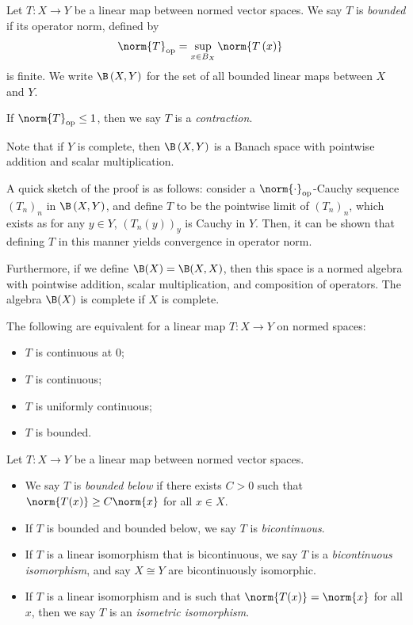 \begin{definition}
  Let $T\colon X\rightarrow Y$ be a linear map between normed vector spaces. We say $T$ is \textit{bounded} if its operator norm, defined by
  \begin{align*}
    \norm{T}_{\op} &= \sup_{x\in B_X}\norm{T\left(x\right)}
  \end{align*}
  is finite. We write $\B\left(X,Y\right)$ for the set of all bounded linear maps between $X$ and $Y$.\newline

  If $\norm{T}_{\op} \leq 1$, then we say $T$ is a \textit{contraction}.
\end{definition}
\begin{remark}
  Note that if $Y$ is complete, then $\B\left(X,Y\right)$ is a Banach space with pointwise addition and scalar multiplication.\newline

  A quick sketch of the proof is as follows: consider a $\norm{\cdot}_{\op}$-Cauchy sequence $\left(T_n\right)_n$ in $\B\left(X,Y\right)$, and define $T$ to be the pointwise limit of $\left(T_n\right)_n$, which exists as for any $y\in Y$, $\left(T_n\left(y\right)\right)_{y}$ is Cauchy in $Y$. Then, it can be shown that defining $T$ in this manner yields convergence in operator norm.\newline

  Furthermore, if we define $\B(X) = \B(X,X)$, then this space is a normed algebra with pointwise addition, scalar multiplication, and composition of operators. The algebra $\B(X)$ is complete if $X$ is complete.
\end{remark}
\begin{fact}\label{fact:continuity_of_linear_maps}
  The following are equivalent for a linear map $T\colon X\rightarrow Y$ on normed spaces:
  \begin{itemize}
    \item $T$ is continuous at $0$;
    \item $T$ is continuous;
    \item $T$ is uniformly continuous;
    \item $T$ is bounded.
  \end{itemize}
\end{fact}
\begin{definition}
  Let $T\colon X\rightarrow Y$ be a linear map between normed vector spaces.
  \begin{itemize}
    \item We say $T$ is \textit{bounded below} if there exists $C > 0$ such that $\norm{T(x)}\geq C\norm{x}$ for all $x\in X$.
    \item If $T$ is bounded and bounded below, we say $T$ is \textit{bicontinuous}.
    \item If $T$ is a linear isomorphism that is bicontinuous, we say $T$ is a \textit{bicontinuous isomorphism}, and say $X\cong Y$ are bicontinuously isomorphic.
    \item If $T$ is a linear isomorphism and is such that $\norm{T(x)} = \norm{x}$ for all $x$, then we say $T$ is an \textit{isometric isomorphism}.
  \end{itemize}
\end{definition}
